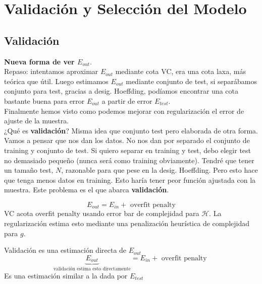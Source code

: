 \documentclass[11pt,a4paper]{article}
\theoremstyle{definition}
\begin{document}
	\section{Validación y Selección del Modelo}
	\subsection{Validación}
	\textbf{Nueva forma de ver $E_{out}$}. \\
	Repaso: intentamos aproximar $E_{out}$ mediante cota VC, era una cota laxa, más teórica que útil. Luego estimamos $E_{out}$ mediante conjunto de test, si separábamos conjunto para test, gracias a desig. Hoeffding, podíamos encontrar una cota bastante buena para error $E_{out}$ a partir de error $E_{test}$. \\
	Finalmente hemos visto como podemos mejorar con regularización el error de ajuste de la muestra.\\
	
	¿Qué es \textbf{validación}? Misma idea que conjunto test pero elaborada de otra forma.\\
	Vamos a pensar que nos dan los datos. No nos dan por separado el conjunto de training y conjunto de test. Si quiero separar en training y test, debo elegir test no demasiado pequeño (nunca será como training obviamente). Tendré que tener un tamaño test, $N$, razonable para que pese en la desig. Hoeffding. Pero esto hace que tenga menos datos en training. Esto haría tener peor función ajustada con la muestra. Este problema es el que abarca \textbf{validación}.
	
	$$E_{out}=E_{in}+\text{ overfit penalty}$$
	VC acota overfit penalty usando error bar de complejidad para $\mathcal{H}$. La regularización estima esto mediante una penalización heurística de complejidad para $g$.
	
	Validación es una estimación directa de $E_{out}$
	$$\underbrace{E_{out}}_{\text{validación estima esto directamente}} = E_{in}+\text{ overfit penalty }$$
	Es una estimación similar a la dada por $E_{test}$
	
\end{document}
